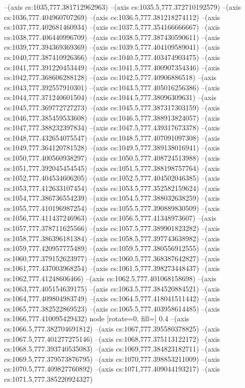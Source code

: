 --(axis cs:1035,777.381712962963)
--(axis cs:1035.5,777.372710192579)
--(axis cs:1036,777.404960707269)
--(axis cs:1036.5,777.381218274112)
--(axis cs:1037,777.402681460934)
--(axis cs:1037.5,777.354166666667)
--(axis cs:1038,777.406440996709)
--(axis cs:1038.5,777.387430590611)
--(axis cs:1039,777.394369369369)
--(axis cs:1039.5,777.404109589041)
--(axis cs:1040,777.387410926366)
--(axis cs:1040.5,777.403474903475)
--(axis cs:1041,777.391220453449)
--(axis cs:1041.5,777.400907354346)
--(axis cs:1042,777.368606288128)
--(axis cs:1042.5,777.40906886518)
--(axis cs:1043,777.392557910301)
--(axis cs:1043.5,777.405016256386)
--(axis cs:1044,777.371240601504)
--(axis cs:1044.5,777.38096309631)
--(axis cs:1045,777.369772727273)
--(axis cs:1045.5,777.387317303159)
--(axis cs:1046,777.385459533608)
--(axis cs:1046.5,777.388913824057)
--(axis cs:1047,777.388232397834)
--(axis cs:1047.5,777.439317673378)
--(axis cs:1048,777.432654075547)
--(axis cs:1048.5,777.407091097308)
--(axis cs:1049,777.364120781528)
--(axis cs:1049.5,777.389138016941)
--(axis cs:1050,777.400560938297)
--(axis cs:1050.5,777.408724513988)
--(axis cs:1051,777.392045454545)
--(axis cs:1051.5,777.388198757764)
--(axis cs:1052,777.404534606205)
--(axis cs:1052.5,777.404502046385)
--(axis cs:1053,777.412633107454)
--(axis cs:1053.5,777.352582159624)
--(axis cs:1054,777.386736554239)
--(axis cs:1054.5,777.388032638259)
--(axis cs:1055,777.410196987254)
--(axis cs:1055.5,777.390889830509)
--(axis cs:1056,777.411437246963)
--(axis cs:1056.5,777.41348973607)
--(axis cs:1057,777.378711625566)
--(axis cs:1057.5,777.389901823282)
--(axis cs:1058,777.386396181384)
--(axis cs:1058.5,777.397743638982)
--(axis cs:1059,777.420957775489)
--(axis cs:1059.5,777.380556912555)
--(axis cs:1060,777.379152623977)
--(axis cs:1060.5,777.368387642827)
--(axis cs:1061,777.437003968254)
--(axis cs:1061.5,777.398273448437)
--(axis cs:1062,777.41248606466)
--(axis cs:1062.5,777.401068158698)
--(axis cs:1063,777.405154639175)
--(axis cs:1063.5,777.384520884521)
--(axis cs:1064,777.409804983749)
--(axis cs:1064.5,777.418041511442)
--(axis cs:1065,777.382522869523)
--(axis cs:1065.5,777.403958614485)
--(axis cs:1066,777.410095429432) node [rotate=0, fill=\bgcol] {0.4}
--(axis cs:1066.5,777.382704691812)
--(axis cs:1067,777.395580378825)
--(axis cs:1067.5,777.401277275146)
--(axis cs:1068,777.375113122172)
--(axis cs:1068.5,777.393740535083)
--(axis cs:1069,777.384823182711)
--(axis cs:1069.5,777.379573876795)
--(axis cs:1070,777.398853211009)
--(axis cs:1070.5,777.409827760892)
--(axis cs:1071,777.409044193217)
--(axis cs:1071.5,777.385220924327)
